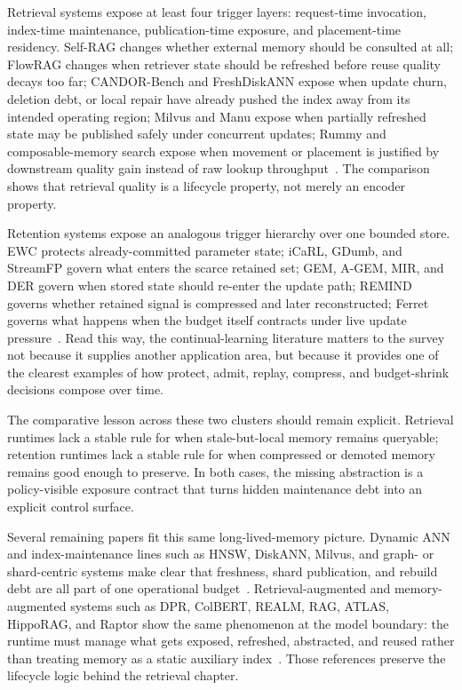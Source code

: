 Retrieval systems expose at least four trigger layers: request-time invocation, index-time maintenance, publication-time exposure, and placement-time residency. Self-RAG changes whether external memory should be consulted at all; FlowRAG changes when retriever state should be refreshed before reuse quality decays too far; CANDOR-Bench and FreshDiskANN expose when update churn, deletion debt, or local repair have already pushed the index away from its intended operating region; Milvus and Manu expose when partially refreshed state may be published safely under concurrent updates; Rummy and composable-memory search expose when movement or placement is justified by downstream quality gain instead of raw lookup throughput~\cite{asai2024selfrag,zhang2026flowrag,wang2026candor,singh2021freshdiskann,wang2021milvus,guo2022manu,zhang2024rummy,quinn2025accelerating}. The comparison shows that retrieval quality is a lifecycle property, not merely an encoder property.

Retention systems expose an analogous trigger hierarchy over one bounded store. EWC protects already-committed parameter state; iCaRL, GDumb, and StreamFP govern what enters the scarce retained set; GEM, A-GEM, MIR, and DER govern when stored state should re-enter the update path; REMIND governs whether retained signal is compressed and later reconstructed; Ferret governs what happens when the budget itself contracts under live update pressure~\cite{kirkpatrick2017ewc,rebuffi2017icarl,prabhu2020gdumb,li2026streamfp,lopez2017gem,chaudhry2019agem,aljundi2019mir,buzzega2020der,hayes2020remind,zhou2025ferret}. Read this way, the continual-learning literature matters to the survey not because it supplies another application area, but because it provides one of the clearest examples of how protect, admit, replay, compress, and budget-shrink decisions compose over time.

The comparative lesson across these two clusters should remain explicit. Retrieval runtimes lack a stable rule for when stale-but-local memory remains queryable; retention runtimes lack a stable rule for when compressed or demoted memory remains good enough to preserve. In both cases, the missing abstraction is a policy-visible exposure contract that turns hidden maintenance debt into an explicit control surface.

Several remaining papers fit this same long-lived-memory picture. Dynamic ANN and index-maintenance lines such as HNSW, DiskANN, Milvus, and graph- or shard-centric systems make clear that freshness, shard publication, and rebuild debt are all part of one operational budget~\cite{malkov2020hnsw,singh2021freshdiskann,wang2021milvus,guo2022manu}. Retrieval-augmented and memory-augmented systems such as DPR, ColBERT, REALM, RAG, ATLAS, HippoRAG, and Raptor show the same phenomenon at the model boundary: the runtime must manage what gets exposed, refreshed, abstracted, and reused rather than treating memory as a static auxiliary index~\cite{karpukhin2020dpr,khattab2020colbert,guu2020realm,lewis2020rag,izacard2022atlas,wang2024hipporag,sarthi2024raptor}. Those references preserve the lifecycle logic behind the retrieval chapter.

